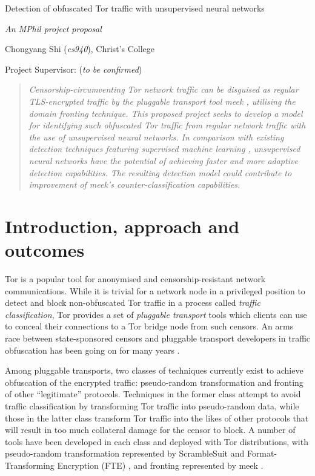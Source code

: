 \documentclass[11pt]{article}
\begin{document}
\centerline{\Large Detection of obfuscated Tor traffic with unsupervised neural networks}
\vspace{2em}
\centerline{\Large \emph{An MPhil project proposal}}
\vspace{2em}
\centerline{\large Chongyang Shi (\emph{cs940}), Christ's College}
\vspace{1em}
\centerline{\large Project Supervisor: (\emph{to be confirmed})}
\vspace{1em}

\begin{abstract}
\textsl{Censorship-circumventing Tor network traffic can be disguised as regular TLS-encrypted traffic by the pluggable transport tool \emph{meek} \cite{fifield2015blocking}, utilising the \emph{domain fronting} technique. This proposed project seeks to develop a model for identifying such obfuscated Tor traffic from regular network traffic with the use of unsupervised neural networks. In comparison with existing detection techniques featuring supervised machine learning \cite[Sec. 6]{wang2015seeing}, unsupervised neural networks have the potential of achieving faster and more adaptive detection capabilities. The resulting detection model could contribute to improvement of meek's counter-classification capabilities.} 
\end{abstract}

\section{Introduction, approach and outcomes}

Tor is a popular tool for anonymised and censorship-resistant network communications. While it is trivial for a network node in a privileged position to detect and block non-obfuscated Tor traffic \cite[Tb. 6] {bujlow2015independent} in a process called \emph{traffic classification}, Tor provides a set of \emph{pluggable transport} tools which clients can use to conceal their connections to a Tor bridge node from such censors. An arms race between state-sponsored censors and pluggable transport developers in traffic obfuscation has been going on for many years \cite{khattak2014systemization}. 

Among pluggable transports, two classes of techniques currently exist to achieve obfuscation of the encrypted traffic: pseudo-random transformation and fronting of other ``legitimate'' protocols. Techniques in the former class attempt to avoid traffic classification by transforming Tor traffic into pseudo-random data, while those in the latter class transform Tor traffic into the likes of other protocols that will result in too much collateral damage for the censor to block. A number of tools have been developed in each class and deployed with Tor distributions, with pseudo-random transformation represented by ScrambleSuit \cite{winter2013scramblesuit} and Format-Transforming Encryption (FTE) \cite{dyer2013protocol}, and fronting represented by meek \cite{fifield2015blocking}. 
\end{document}
